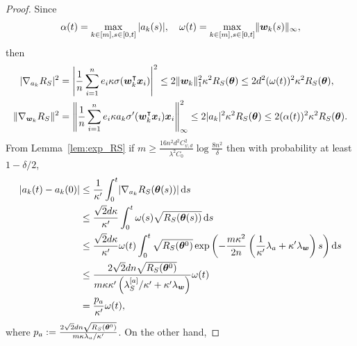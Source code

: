 \documentclass{article}
\begin{document}
\begin{proof}
    Since
    \begin{equation}
        \alpha(t)=\max\limits_{k\in[m],s\in[0,t]}|a_k(s)|, \quad \omega(t)=\max\limits_{k\in[m],s\in[0,t]}\lVert\bm{w}_k(s)\rVert_{\infty},
    \end{equation}
    then
    \begin{equation}
        \begin{aligned}
            \lvert\nabla_{a_k}R_S\rvert^2    & =\left\lvert\frac{1}{n}\sum_{i=1}^n e_i\kappa\sigma(\bm{w}_k^\intercal\bm{x}_i)\right\rvert^2\leq 2\lVert\bm{w}_k\rVert^2_1\kappa^2R_S(\bm{\theta})\leq 2d^2(\omega(t))^2\kappa^2R_S(\bm{\theta}),            \\
            \lVert\nabla_{\bm{w}_k}R_S\rVert^2 & =\left\lVert\frac{1}{n}\sum_{i=1}^n e_i\kappa a_k\sigma'(\bm{w}_k^\intercal\bm{x}_i)\bm{x}_i\right\rVert^2_{\infty}\leq 2\lvert a_k\rvert^2\kappa^2R_S(\bm{\theta})\leq 2(\alpha(t))^2\kappa^2R_S(\bm{\theta}).
        \end{aligned}
    \end{equation}
    From Lemma~\ref{lem:exp_RS} if $m\geq \frac{16n^2d^2C_{\psi,d}^2}{\lambda^2C_0}\log\frac{8n^2}{\delta}$ then with probability at least $1 - \delta/2$,
    \begin{equation}
        \begin{aligned}
            \lvert a_k(t) - a_k(0)\rvert
             & \leq\frac{1}{\kappa'}\int_0^t\lvert\nabla_{a_k}R_S(\bm{\theta}(s))\rvert\mathop{}\!\mathrm{d}{s}                                                                                                                \\
             & \leq\frac{\sqrt{2}d\kappa}{\kappa'}\int_{0}^{t} \omega(s)\sqrt{R_S(\bm{\theta}(s))}\mathop{}\!\mathrm{d}{s}                                                                                                     \\
             & \leq\frac{\sqrt{2}d\kappa}{\kappa'}\omega(t)\int_{0}^{t}\sqrt{R_S(\bm{\theta}^0)}\exp\left(-\frac{m\kappa^2}{2n}\left(\frac{1}{\kappa'}\lambda_a+\kappa'\lambda_{\bm{w}}\right)s\right)\mathop{}\!\mathrm{d}{s} \\
             & \leq \frac{2\sqrt{2}dn\sqrt{R_S(\bm{\theta}^0)}}{m\kappa\kappa'\left(\lambda^{[a]}_S/\kappa'+\kappa'\lambda_{\bm{w}}\right)}\omega(t)                                                        \\
             & =\frac{p_a}{\kappa'}\omega(t),
        \end{aligned}
    \end{equation}
    where $p_a := \frac{2\sqrt{2}dn\sqrt{R_S(\bm{\theta}^0)}}{m\kappa\lambda_a/\kappa'}$. On the other hand,

\end{proof}
\end{document}
